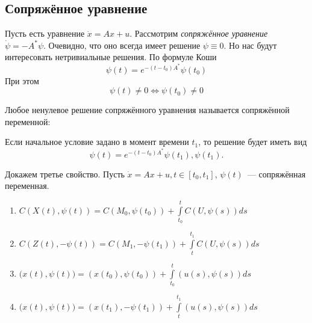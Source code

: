 \subsection{Сопряжённое уравнение}
Пусть есть уравнение $\dot{x} = Ax + u$.
Рассмотрим \textit{сопряжённое уравнение} $\dot{\psi} = -A^* \psi$.
Очевидно, что оно всегда имеет решение $\psi \equiv 0$.
Но нас будут интересовать нетривиальные решения.
По формуле Коши
\begin{equation*}
    \psi(t) = e^{-(t - t_0)A^*} \psi(t_0)
\end{equation*}
При этом
\begin{equation*}
    \psi(t) \neq 0 \iff \psi(t_0) \neq 0
\end{equation*}

\begin{defn}
    Любое ненулевое решение сопряжённого уравнения называется сопряжённой переменной:
\end{defn}

Если начальное условие задано в момент времени $t_1$, то решение будет иметь вид
\begin{equation*}
    \psi(t) = e^{-(t - t_0)A^*} \psi(t_1), \psi(t_1).
\end{equation*}

\begin{lem}
    Докажем третье свойство.
    Пусть $\dot{x} = Ax + u, t \in [t_0, t_1]$, $\psi(t)$~--- сопряжённая переменная.
    \begin{enumerate}
        \item $C(X(t), \psi(t)) = C(M_0, \psi(t_0)) + \int\limits_{t_0}^t C(U, \psi(s)) ds$
        \item $C(Z(t), -\psi(t)) = C(M_1, -\psi(t_1)) + \int\limits_{t}^{t_1} C(U, \psi(s)) ds$
        \item $\bigl( x(t), \psi(t) \bigr) = (x(t_0), \psi(t_0)) + \int\limits_{t_0}^{t} (u(s), \psi(s)) ds$
        \item $\bigl( x(t), \psi(t) \bigr) = (x(t_1), -\psi(t_1)) + \int\limits_{t}^{t_1} (u(s), \psi(s)) ds$
    \end{enumerate}
\end{lem}

